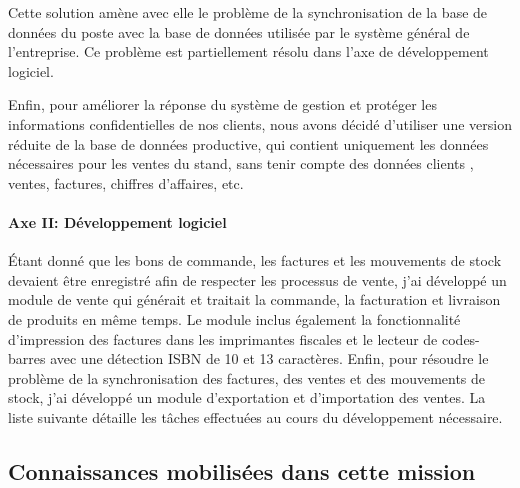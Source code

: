 \documentclass{resume} %
\begin{document}
Cette solution amène avec elle le problème de la synchronisation de la base de données du poste avec la base de données utilisée par le système général de l'entreprise. Ce problème est partiellement résolu dans l'axe de développement logiciel.

Enfin, pour améliorer la réponse du système de gestion et protéger les informations confidentielles de nos clients, nous avons décidé d'utiliser une version réduite de la base de données productive, qui contient uniquement les données nécessaires pour les ventes du stand, sans tenir compte des données clients , ventes, factures, chiffres d'affaires, etc.
	
		\paragraph{Axe II: Développement logiciel}	
Étant donné que les bons de commande, les factures et les mouvements de stock devaient être enregistré  afin de respecter les processus de vente, j'ai développé un module de vente qui générait et traitait la commande, la facturation et livraison de produits en même temps.
Le module inclus également la fonctionnalité d'impression des factures dans les imprimantes fiscales et le lecteur de codes-barres avec une détection ISBN de 10 et 13 caractères.
Enfin, pour résoudre le problème de la synchronisation des factures, des ventes et des mouvements de stock, j'ai développé un module d'exportation et d'importation des ventes.
La liste suivante détaille les tâches effectuées au cours du développement nécessaire.

	\subsection {Connaissances mobilisées dans cette mission }
			
\end{document}
